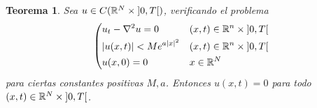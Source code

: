 \documentclass{article}
\newcommand{\realNumbers}{\mathbb{R}}
\newtheorem{theorem}{Teorema}
\theoremstyle{definition}
\theoremstyle{remark}
\newcommand{\leftOpenInterval}{\left]}
\newcommand{\rightOpenInterval}{\right[}
\newcommand{\leftClosedInterval}{\left[}
\newcommand{\rightClosedInterval}{\right]}
\newcommand{\interval}[3]{%
  \ifstrequal{#1}{oo}{%
    \leftOpenInterval #2, #3 \rightOpenInterval%
  }{%
    \ifstrequal{#1}{co}{%
      \leftClosedInterval #2, #3 \rightOpenInterval%
    }{%
      \ifstrequal{#1}{oc}{
        \leftOpenInterval #2, #3 \rightClosedInterval%
      }{%
        \ifstrequal{#1}{cc}{
          \leftClosedInterval #2, #3 \rightClosedInterval
        }{%
        }%
      }%
    }%
  }%
}
\begin{document}
  \begin{theorem}
    Sea \(u \in C(\realNumbers^N \times \interval{oo}{0}{T})\), verificando el problema
    \begin{align}
      \left(
        \begin{aligned}        
          &u_t - \laplacian u = 0
            && (x, t) \in \realNumbers^n \times \interval{oo}{0}{T}
          \\
          & \abs{u(x, t)} < M e^{a \abs{x}^2}
            && (x, t) \in \realNumbers^n \times \interval{oo}{0}{T}
          \\
          &u(x, 0) = 0
            && x \in \realNumbers^N
        \end{aligned}
      \right.
    \end{align}
    para ciertas constantes positivas \(M, a\).
    Entonces \(u(x, t) = 0\) para todo \((x, t) \in \realNumbers^N \times \interval{oo}{0}{T}\).
  \end{theorem}
\end{document}
